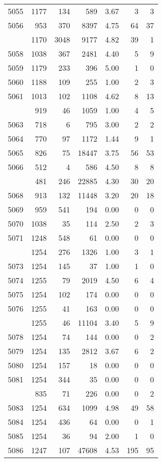 \documentclass[
]{article}
\begin{document}
\begin{table}
\begin{tabular}[t]{lrrrrrr}
5055 & 1177 & 134 & 589 & 3.67 & 3 & 3\\
5056 & 953 & 370 & 8397 & 4.75 & 64 & 37\\
\addlinespace
5057 & 1170 & 3048 & 9177 & 4.82 & 39 & 1\\
5058 & 1038 & 367 & 2481 & 4.40 & 5 & 9\\
5059 & 1179 & 233 & 396 & 5.00 & 1 & 0\\
5060 & 1188 & 109 & 255 & 1.00 & 2 & 3\\
5061 & 1013 & 102 & 1108 & 4.62 & 8 & 13\\
\addlinespace
5062 & 919 & 46 & 1059 & 1.00 & 4 & 5\\
5063 & 718 & 6 & 795 & 3.00 & 2 & 2\\
5064 & 770 & 97 & 1172 & 1.44 & 9 & 1\\
5065 & 826 & 75 & 18447 & 3.75 & 56 & 53\\
5066 & 512 & 4 & 586 & 4.50 & 8 & 8\\
\addlinespace
5067 & 481 & 246 & 22885 & 4.30 & 30 & 20\\
5068 & 913 & 132 & 11448 & 3.20 & 20 & 18\\
5069 & 959 & 541 & 194 & 0.00 & 0 & 0\\
5070 & 1038 & 35 & 114 & 2.50 & 2 & 3\\
5071 & 1248 & 548 & 61 & 0.00 & 0 & 0\\
\addlinespace
5072 & 1254 & 276 & 1326 & 1.00 & 3 & 1\\
5073 & 1254 & 145 & 37 & 1.00 & 1 & 0\\
5074 & 1255 & 79 & 2019 & 4.50 & 6 & 4\\
5075 & 1254 & 102 & 174 & 0.00 & 0 & 0\\
5076 & 1255 & 41 & 163 & 0.00 & 0 & 0\\
\addlinespace
5077 & 1255 & 46 & 11104 & 3.40 & 5 & 9\\
5078 & 1254 & 74 & 144 & 0.00 & 0 & 2\\
5079 & 1254 & 135 & 2812 & 3.67 & 6 & 2\\
5080 & 1254 & 157 & 18 & 0.00 & 0 & 0\\
5081 & 1254 & 344 & 35 & 0.00 & 0 & 0\\
\addlinespace
5082 & 835 & 71 & 226 & 0.00 & 0 & 2\\
5083 & 1254 & 634 & 1099 & 4.98 & 49 & 58\\
5084 & 1254 & 436 & 64 & 0.00 & 0 & 1\\
5085 & 1254 & 36 & 94 & 2.00 & 1 & 0\\
5086 & 1247 & 107 & 47608 & 4.53 & 195 & 95\\

\end{tabular}
\end{table}
\end{document}
